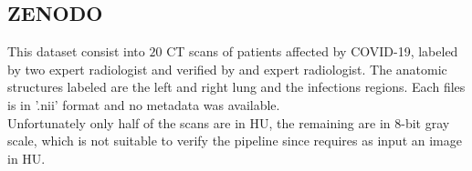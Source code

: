 \documentclass{standalone}
\begin{document}
	\subsection{ZENODO}
	This dataset consist into $20$ CT scans of patients affected by COVID-19, labeled by two expert radiologist and verified by and expert radiologist. 
	The anatomic structures labeled are the left and right lung and the infections regions. 
	Each files is in '.nii' format and no metadata was available.\\
	
	Unfortunately only half of the scans are in HU, the remaining are in 8-bit gray scale, which is not suitable to verify the pipeline since requires as input an image in HU.
\end{document}
